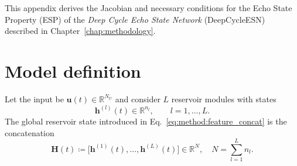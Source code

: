 \newcommand{\DCR}{DeepCycleESN}
\newcommand{\DCRalt}{$\mathrm{DeepESN_{Cycle}$}}
\newcommand{\DAR}{DeepAntisymESN}
\newcommand{\DARalt}{$\mathrm{DeepESN_{Antisym}$}}
\newcommand{\DCO}{DeepCycleRON}
\newcommand{\DCOalt}{$\mathrm{DeepRON_{Cycle}$}}
\newcommand{\DAO}{DeepAntisymRON}
\newcommand{\DAOalt}{$\mathrm{DeepRON_{Antisym}$}}



\newcommand{\WtotCycle}{
    \begin{bmatrix}
    \Wrec{1} & \mathbf{0} & \cdots & \mathbf{\Wcyc{1}} \\
    \Wcyc{2} & \Wrec{2} & \cdots & \mathbf{0} \\
    \vdots & \ddots & \ddots & \vdots \\
    \mathbf{0} & \cdots & \Wcyc{L
    } & \Wrec{L}
    \end{bmatrix}
}

\newcommand{\WtotAntisym}{
    \begin{bmatrix}
    \Wrec{1}-\gamma I & -\epsilon\Cbwd{1}^\top & \cdots & \mathbf{0} \\
    \epsilon\Cfwd{2} & \Wrec{2}-\gamma I & \ddots & \vdots \\
    \vdots & \ddots & \ddots & -\epsilon\Cbwd{L-1}^\top \\
    \mathbf{0} & \cdots & \epsilon\Cfwd{L} & \Wrec{L}-\gamma I
    \end{bmatrix}
}


\label{ch:appendix-A}

This appendix derives the Jacobian and necessary conditions for the Echo State Property (ESP) of the
\emph{Deep Cycle Echo State Network} (\DCR) described in Chapter~\ref{chap:methodology}. 

\section{Model definition}
\label{sec:dcr-definition}

Let the input be $\mathbf{u}(t)\in\mathbb{R}^{N_U}$ and consider $L$ reservoir modules with states
\[
\mathbf{h}^{(l)}(t)\in\mathbb{R}^{n_l},\qquad l=1,\dots,L.
\]
The global reservoir state introduced in Eq.~\eqref{eq:method:feature_concat} is the concatenation
\[
\mathbf{H}(t) \coloneqq \big[\mathbf{h}^{(1)}(t),\dots,\mathbf{h}^{(L)}(t)\big] \in \mathbb{R}^{N},\quad N=\sum_{l=1}^L n_l.
\]


